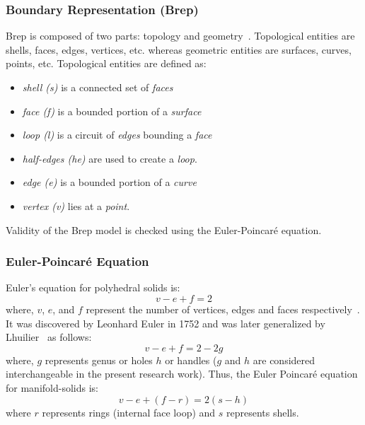 \subsubsection{Boundary Representation (Brep)}

Brep is composed of two parts: topology and geometry~\cite{Hegde2013}. Topological entities are shells, faces, edges, vertices, etc. whereas geometric entities are surfaces, curves, points, etc. Topological entities are defined as:

\begin{itemize}
[noitemsep,topsep=2pt,parsep=2pt,partopsep=2pt]
\item {\em shell (s)}  is a connected set of {\em faces}
\item {\em face (f)} is a bounded portion of a {\em surface}
\item {\em loop (l)} is a circuit of {\em edges} bounding a {\em face}
\item {\em half-edges (he)} are used to create a {\em loop}.
\item {\em edge (e)} is a bounded portion of a {\em curve}
\item {\em vertex (v)} lies at a {\em point}. 
\end{itemize}

Validity of the Brep model is checked using the Euler-Poincar\'e equation.

\subsubsection{Euler-Poincar\'e Equation}
Euler's equation for polyhedral solids is: \begin{equation}\label{eqn:manifoldsolid}v - e + f = 2\end{equation} where, $v$, $e$, and $f$ represent the number of vertices, edges and faces respectively~\cite{Hegde2013}. It was discovered by Leonhard Euler in 1752 and was later generalized by Lhuilier~\cite{Krishnamurti2002} as follows: \begin{equation}\label{eqn:genmanifoldsolid}v - e + f = 2 - 2g\end{equation} where, $g$ represents genus or holes $h$ or handles ($g$ and $h$ are considered interchangeable in the present research work). Thus, the Euler Poincar\'e equation for manifold-solids is:
\begin{equation}
v - e + (f - r) = 2 (s - h)
\label{eqn:topoval:manifold}
\end{equation} where $r$ represents rings (internal face loop) and $s$ represents shells.

